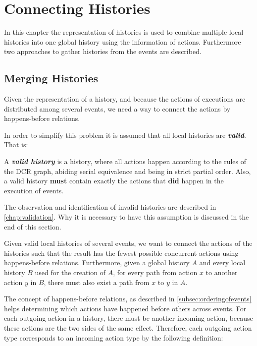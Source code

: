 \chapter{Connecting Histories}\label{chap:connecting-histories}
	In this chapter the representation of histories is used to combine multiple local histories into one global history using the information of actions. Furthermore two approaches to gather histories from the events are described.
    
    \section{Merging Histories}\label{sec:connecting:merge}
    Given the representation of a history, and because the actions of executions are distributed among several events, we need a way to connect the actions by happens-before relations.

	\newpar In order to simplify this problem it is assumed that all local histories are \textit{\textbf{valid}}. That is:
    
    \begin{definition}
    A \textit{\textbf{valid history}} is a history, where all actions happen according to the rules of the DCR graph, abiding serial equivalence and being in strict partial order. Also, a valid history \textbf{must} contain exactly the actions that \textbf{did} happen in the execution of events.
    \label{def:validhistory}
    \end{definition} 

	\noindent The observation and identification of invalid histories are described in \autoref{chap:validation}. Why it is necessary to have this assumption is discussed in the end of this section.

    \newpar Given valid local histories of several events, we want to connect the actions of the histories such that the result has the fewest possible concurrent actions using happens-before relations. Furthermore, given a global history $A$ and every local history $B$ used for the creation of $A$, for every path from action $x$ to another action $y$ in $B$, there must also exist a path from $x$ to $y$ in $A$.
    
    \newpar The concept of happens-before relations, as described in \autoref{subsec:orderingofevents} helps determining which actions have happened before others across events. For each outgoing action in a history, there must be another incoming action, because these actions are the two sides of the same effect. Therefore, each outgoing action type corresponds to an incoming action type by the following definition:
	
